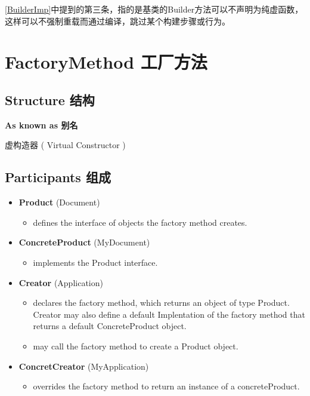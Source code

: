 \ref{BuilderImp}中提到的第三条，指的是基类的Builder方法可以不声明为纯虚函数，这样可以不强制重载而通过编译，跳过某个构建步骤或行为。

\section{FactoryMethod 工厂方法}

\subsection{Structure 结构}


\textbf{ As known as 别名 }

虚构造器 ( Virtual Constructor )

\subsection{Participants 组成}

\begin{itemize}
\small

\item \textbf{Product} (Document)
	\begin{itemize}
		\item defines the interface of objects the factory method creates.
	\end{itemize}

\item \textbf{ConcreteProduct} (MyDocument)
	\begin{itemize}
		\item implements the Product interface.
	\end{itemize}

\item \textbf{Creator} (Application)
	\begin{itemize} 
		\item declares the factory method, which returns an object of type Product. Creator may also define a default Implentation of the factory method that returns a default ConcreteProduct object.

		\item may call the factory method to create a Product object.
	\end{itemize}

\item \textbf{ConcretCreator} (MyApplication)
	\begin{itemize}
		\item overrides the factory method to return an instance of a concreteProduct.
	\end{itemize}

\normalize
\end{itemize}

